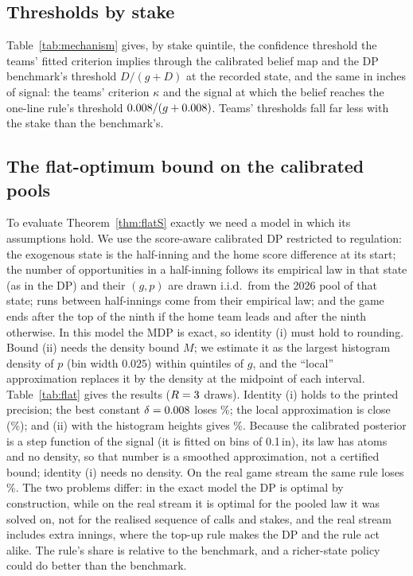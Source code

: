 \documentclass[aoas]{imsart}
\theoremstyle{plain}
\theoremstyle{definition}
\begin{document}
\subsection{Thresholds by stake}\label{sec:mechanism}
Table~\ref{tab:mechanism} gives, by stake quintile, the confidence threshold the teams' fitted criterion implies
through the calibrated belief map and the DP benchmark's threshold $D/(g+D)$ at the recorded state, and the same in
inches of signal: the teams' criterion $\kappa$ and the signal at which the belief reaches the one-line rule's
threshold $0.008/(g+0.008)$. Teams' thresholds fall far less with the stake than the benchmark's.

\begin{table}[!htbp]
\caption{Revealed and benchmark thresholds by stake quintile (eligible pitches, comparator, $R$ draws of the belief
map). Signal thresholds are averages over the pitches of the quintile.}\label{tab:mechanism}
\centering\small

\end{table}

\subsection{The flat-optimum bound on the calibrated pools}\label{sec:flat}
To evaluate Theorem~\ref{thm:flatS} exactly we need a model in which its assumptions hold. We use the score-aware
calibrated DP restricted to regulation: the exogenous state is the half-inning and the home score difference at its
start; the number of opportunities in a half-inning follows its empirical law in that state (as in the DP) and
their $(g,p)$ are drawn i.i.d.\ from the 2026 pool of that state; runs between half-innings come from their empirical law; and the game ends after the top of the ninth if the
home team leads and after the ninth otherwise. In this model the MDP is exact, so identity (i) must hold to rounding.
Bound (ii) needs the density bound $M$; we estimate it as the largest histogram density of $p$ (bin width $0.025$)
within quintiles of $g$, and the ``local'' approximation replaces it by the density at the midpoint of each interval.
Table~\ref{tab:flat} gives the results ($R=3$ draws). Identity (i) holds to the printed precision; the best
constant $\delta=0.008$ loses \FlatLoss\%; the local approximation is close (\FlatLocal\%); and (ii) with
the histogram heights gives \FlatBound\%. Because the calibrated posterior is a step function of the signal (it is
fitted on bins of 0.1\,in), its law has atoms and no density, so that number is a smoothed approximation, not a
certified bound; identity (i) needs no density. On the real game stream the same rule loses \RuleLossStream\%. The two
problems differ: in the exact model the DP is optimal by construction, while on the real stream it is optimal for the
pooled law it was solved on, not for the realised sequence of calls and stakes, and the real stream includes extra
innings, where the top-up rule makes the DP and the rule act alike. The rule's share is relative to the benchmark,
and a richer-state policy could do better than the benchmark.
\end{document}
